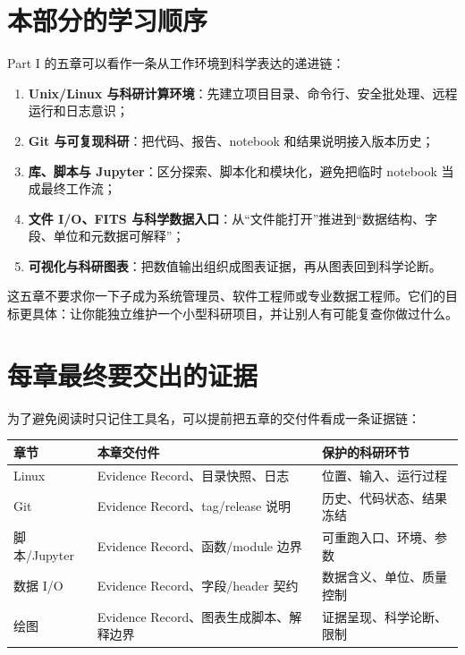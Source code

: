 \section*{本部分的学习顺序}

Part I 的五章可以看作一条从工作环境到科学表达的递进链：

\begin{enumerate}
    \item \textbf{Unix/Linux 与科研计算环境}：先建立项目目录、命令行、安全批处理、远程运行和日志意识；
    \item \textbf{Git 与可复现科研}：把代码、报告、notebook 和结果说明接入版本历史；
    \item \textbf{库、脚本与 Jupyter}：区分探索、脚本化和模块化，避免把临时 notebook 当成最终工作流；
    \item \textbf{文件 I/O、FITS 与科学数据入口}：从“文件能打开”推进到“数据结构、字段、单位和元数据可解释”；
    \item \textbf{可视化与科研图表}：把数值输出组织成图表证据，再从图表回到科学论断。
\end{enumerate}

这五章不要求你一下子成为系统管理员、软件工程师或专业数据工程师。它们的目标更具体：让你能独立维护一个小型科研项目，并让别人有可能复查你做过什么。

\section*{每章最终要交出的证据}

为了避免阅读时只记住工具名，可以提前把五章的交付件看成一条证据链：

\begin{center}
\begin{tabular}{p{}p{}p{}}
\toprule
章节 & 本章交付件 & 保护的科研环节 \\
\midrule
Linux & Evidence Record、目录快照、日志 & 位置、输入、运行过程 \\
Git & Evidence Record、tag/release 说明 & 历史、代码状态、结果冻结 \\
脚本/Jupyter & Evidence Record、函数/module 边界 & 可重跑入口、环境、参数 \\
数据 I/O & Evidence Record、字段/header 契约 & 数据含义、单位、质量控制 \\
绘图 & Evidence Record、图表生成脚本、解释边界 & 证据呈现、科学论断、限制 \\
\bottomrule
\end{tabular}
\end{center}

